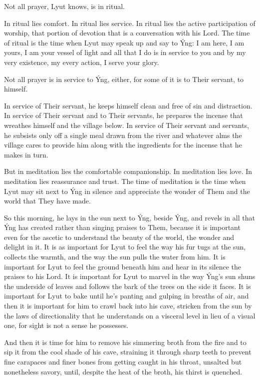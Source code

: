 Not all prayer, Lyut knows, is in ritual.

In ritual lies comfort. In ritual lies service. In ritual lies the active participation of worship, that portion of devotion that is a conversation with his Lord. The time of ritual is the time when Lyut may speak up and say to Ýng: I am here, I am yours, I am your vessel of light and all that I do is in service to you and by my very existence, my every action, I serve your glory.

Not all prayer is in service to Ýng, either, for some of it is to Their servant, to himself.

In service of Their servant, he keeps himself clean and free of sin and distraction. In service of Their servant and to Their servants, he prepares the incense that wreathes himself and the village below. In service of Their servant and servants, he subsists only off a single meal drawn from the river and whatever alms the village cares to provide him along with the ingredients for the incense that he makes in turn.

But in meditation lies the comfortable companionship. In meditation lies love. In meditation lies reassurance and trust. The time of meditation is the time when Lyut may sit next to Ýng in silence and appreciate the wonder of Them and the world that They have made.

So this morning, he lays in the sun next to Ýng, beside Ýng, and revels in all that Ýng has created rather than singing praises to Them, because it is important even for the ascetic to understand the beauty of the world, the wonder and delight in it. It is as important for Lyut to feel the way his fur tugs at the sun, collects the warmth, and the way the sun pulls the water from him. It is important for Lyut to feel the ground beneath him and hear in its silence the praises to his Lord. It is important for Lyut to marvel in the way Ýng's sun shuns the underside of leaves and follows the bark of the trees on the side it faces. It is important for Lyut to bake until he's panting and gulping in breaths of air, and then it is important for him to crawl back into his cave, stricken from the sun by the laws of directionality that he understands on a visceral level in lieu of a visual one, for sight is not a sense he possesses.

And then it is time for him to remove his simmering broth from the fire and to sip it from the cool shade of his cave, straining it through sharp teeth to prevent fine carapaces and finer bones from getting caught in his throat, unsalted but nonetheless savory, until, despite the heat of the broth, his thirst is quenched.

